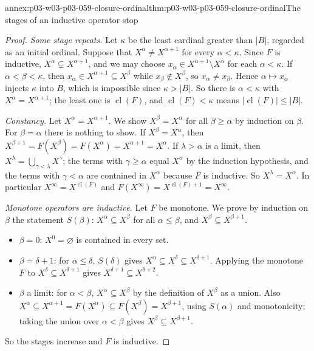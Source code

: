 \begin{annexitem}{annex:p03-w03-p03-059-closure-ordinal}{thm:p03-w03-p03-059-closure-ordinal}{The stages of an inductive operator stop}
\begin{proof}
\emph{Some stage repeats.} Let \(\kappa\) be the least cardinal greater than
\(|B|\), regarded as an initial ordinal. Suppose that
\(X^\alpha\neq X^{\alpha+1}\) for every \(\alpha<\kappa\). Since \(F\) is
inductive, \(X^\alpha\subsetneq X^{\alpha+1}\), and we may choose
\(x_\alpha\in X^{\alpha+1}\setminus X^\alpha\) for each \(\alpha<\kappa\).
If \(\alpha<\beta<\kappa\), then \(x_\alpha\in X^{\alpha+1}\subseteq
X^\beta\) while \(x_\beta\notin X^\beta\), so \(x_\alpha\neq x_\beta\).
Hence \(\alpha\mapsto x_\alpha\) injects \(\kappa\) into \(B\), which is
impossible since \(\kappa>|B|\). So there is \(\alpha<\kappa\) with
\(X^\alpha=X^{\alpha+1}\); the least one is \(\operatorname{cl}(F)\), and
\(\operatorname{cl}(F)<\kappa\) means \(|\operatorname{cl}(F)|\leq|B|\).

\emph{Constancy.} Let \(X^\alpha=X^{\alpha+1}\). We show
\(X^\beta=X^\alpha\) for all \(\beta\geq\alpha\) by induction on
\(\beta\). For \(\beta=\alpha\) there is nothing to show. If
\(X^\beta=X^\alpha\), then \(X^{\beta+1}=F(X^\beta)=F(X^\alpha)=
X^{\alpha+1}=X^\alpha\). If \(\lambda>\alpha\) is a limit, then
\(X^\lambda=\bigcup_{\gamma<\lambda}X^\gamma\); the terms with
\(\gamma\geq\alpha\) equal \(X^\alpha\) by the induction hypothesis, and the
terms with \(\gamma<\alpha\) are contained in \(X^\alpha\) because \(F\) is
inductive. So \(X^\lambda=X^\alpha\). In particular
\(X^\infty=X^{\operatorname{cl}(F)}\) and
\(F(X^\infty)=X^{\operatorname{cl}(F)+1}=X^\infty\).

\emph{Monotone operators are inductive.} Let \(F\) be monotone. We prove by
induction on \(\beta\) the statement \(S(\beta)\): \(X^\alpha\subseteq
X^\beta\) for all \(\alpha\leq\beta\), and \(X^\beta\subseteq X^{\beta+1}\).
\begin{itemize}
 \item \(\beta=0\): \(X^0=\varnothing\) is contained in every set.
 \item \(\beta=\delta+1\): for \(\alpha\leq\delta\), \(S(\delta)\) gives
       \(X^\alpha\subseteq X^\delta\subseteq X^{\delta+1}\). Applying the
       monotone \(F\) to \(X^\delta\subseteq X^{\delta+1}\) gives
       \(X^{\delta+1}\subseteq X^{\delta+2}\).
 \item \(\beta\) a limit: for \(\alpha<\beta\), \(X^\alpha\subseteq
       X^\beta\) by the definition of \(X^\beta\) as a union. Also
       \(X^\alpha\subseteq X^{\alpha+1}=F(X^\alpha)\subseteq F(X^\beta)=
       X^{\beta+1}\), using \(S(\alpha)\) and monotonicity; taking the
       union over \(\alpha<\beta\) gives \(X^\beta\subseteq X^{\beta+1}\).
\end{itemize}
So the stages increase and \(F\) is inductive.
\end{proof}
\end{annexitem}

